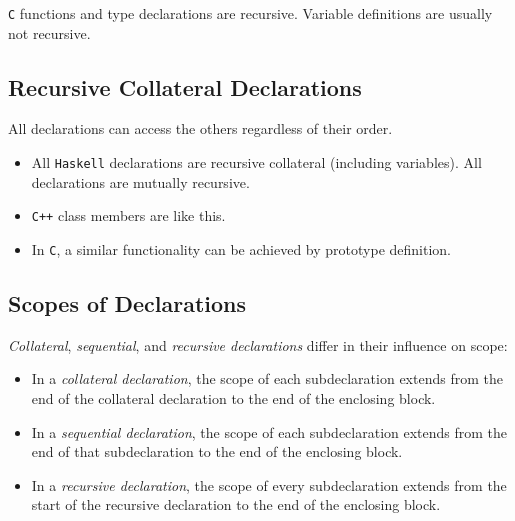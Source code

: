 \texttt{C} functions and type declarations are recursive. Variable definitions are usually not recursive.

\subsection{Recursive Collateral Declarations}

All declarations can access the others regardless of their order.
\begin{itemize}
  \item All \texttt{Haskell} declarations are recursive collateral (including variables). All declarations are mutually recursive.
  \item \texttt{C++} class members are like this.
  \item In \texttt{C}, a similar functionality can be achieved by prototype
  definition.
\end{itemize}

\subsection{Scopes of Declarations}

\textit{Collateral}, \textit{sequential}, and \textit{recursive declarations} differ in their influence on scope:
\begin{itemize}
  \item In a \textit{collateral declaration}, the scope of each subdeclaration extends from the end of the collateral declaration to the end of the enclosing block.
  \item In a \textit{sequential declaration}, the scope of each subdeclaration extends from the end of that subdeclaration to the end of the enclosing block.
  \item In a \textit{recursive declaration}, the scope of every subdeclaration extends from the start of the recursive declaration to the end of the enclosing block.
\end{itemize}
